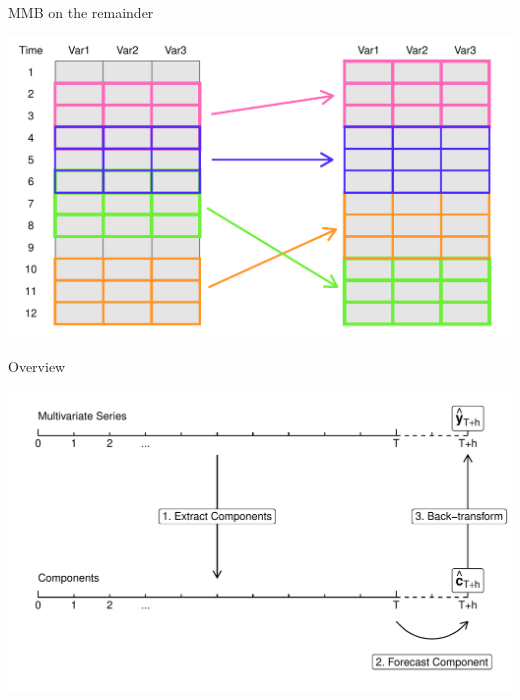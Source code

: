 \documentclass[14pt,ignorenonframetext,]{beamer}
\begin{document}
\begin{frame}{MMB on the remainder}
\protect\hypertarget{mmb-on-the-remainder}{}
\begin{center}
\includegraphics[width=\linewidth]{plot/p_mmb}
\end{center}
\end{frame}

\begin{frame}{Overview}
\protect\hypertarget{overview-2}{}
\begin{center}
\includegraphics[width=\linewidth]{plot/p_timeline_notation}
\end{center}
\end{frame}
\end{document}
